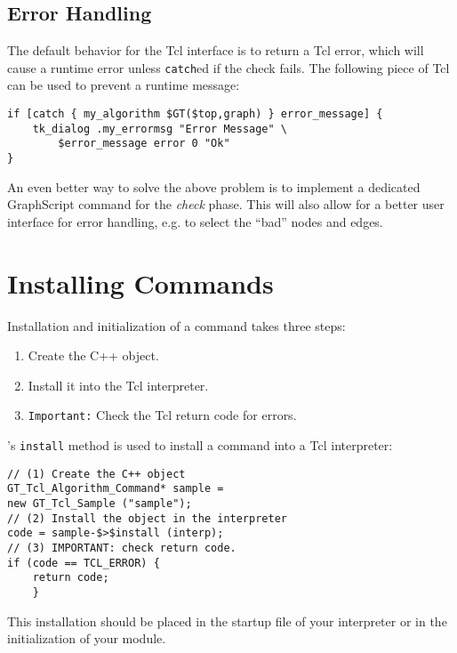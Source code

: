 \documentclass[twoside,fleqn]{report}
\begin{document}
%
%

\subsection{Error Handling}

The default behavior for the Tcl interface is to return a
Tcl error, which will cause a runtime error unless
\texttt{catch}ed if the check fails. The following piece of Tcl
can be used to prevent a runtime message:

\begin{verbatim}
if [catch { my_algorithm $GT($top,graph) } error_message] {
    tk_dialog .my_errormsg "Error Message" \
        $error_message error 0 "Ok"
}
\end{verbatim}%
  
\noindent An even better way to solve the above problem is to implement a
dedicated GraphScript command for the \emph{check} phase. This
will also allow for a better user interface for error handling,
e.g. to select the ``bad'' nodes and edges.



%
%

\section{Installing \GraphScript{} Commands}
Installation and initialization of a \GraphScript{} command takes three steps:
\begin{enumerate}
  \item Create the C++ object.
  \item Install it into the Tcl interpreter.
  \item \texttt{Important:}
  Check the Tcl return code for errors.
\end{enumerate}
's 
\texttt{install} method is used to install a command into a Tcl 
interpreter:
\begin{verbatim}
// (1) Create the C++ object
GT_Tcl_Algorithm_Command* sample =
new GT_Tcl_Sample ("sample");
// (2) Install the object in the interpreter
code = sample-$>$install (interp);
// (3) IMPORTANT: check return code.
if (code == TCL_ERROR) {
    return code;
    }
\end{verbatim}

This installation should be placed in the startup file of your
\GraphScript{} interpreter or in the
initialization of your module.
\end{document}
